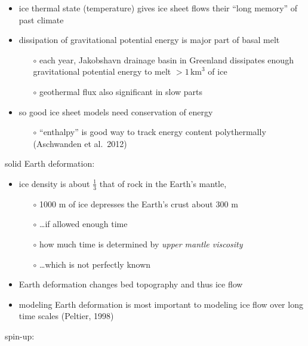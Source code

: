 \documentclass[titlepage,letterpaper,final,12pt]{scrartcl}
\begin{document}
\begin{itemize}
\item ice thermal state (temperature) gives ice sheet flows their ``long memory'' of past climate
\item dissipation of gravitational potential energy is major part of basal melt
  \begin{itemize}
  \item[$\circ$] each year, Jakobshavn drainage basin in Greenland dissipates enough gravitational potential energy to melt $> 1\,\text{km}^3$ of ice
  \item[$\circ$] geothermal flux also significant in slow parts
  \end{itemize}
\item so good ice sheet models need conservation of energy
  \begin{itemize}
  \item[$\circ$] ``enthalpy'' is good way to track energy content polythermally (Aschwanden et al.~2012)\nocite{AschwandenBuelerKhroulevBlatter}
  \end{itemize}
\end{itemize}

solid Earth deformation:

\begin{itemize}
\item ice density is about $\frac{1}{3}$ that of rock in the Earth's mantle,
  \begin{itemize}
  \item[$\circ$] 1000 m of ice depresses the Earth's crust about 300 m
  \item[$\circ$] \dots if allowed enough time
  \item[$\circ$] how much time is determined by \emph{upper mantle viscosity}
  \item[$\circ$] \dots which is not perfectly known
  \end{itemize}
\item Earth deformation changes bed topography and thus ice flow
\item modeling Earth deformation is most important to modeling ice flow over long time scales (Peltier, 1998)\nocite{Peltier1998review}
\end{itemize}


spin-up:
\end{document}
